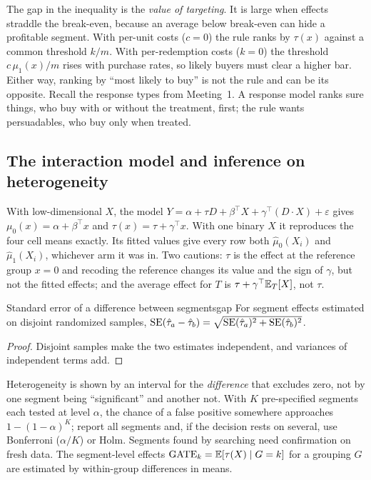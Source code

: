 \documentclass[11pt]{article}
\begin{document}
The gap in the inequality is the \emph{value of targeting}. It is large when effects straddle the break-even,
because an average below break-even can hide a profitable segment. With per-unit costs ($c=0$) the rule ranks by
$\tau(x)$ against a common threshold $k/m$. With per-redemption costs ($k=0$) the threshold $c\,\mu_1(x)/m$
rises with purchase rates, so likely buyers must clear a higher bar. Either way, ranking by ``most likely to
buy'' is not the rule and can be its opposite. Recall the response types from Meeting~1. A response model ranks
sure things, who buy with or without the treatment, first; the rule wants persuadables, who buy only when
treated.

\subsection{The interaction model and inference on heterogeneity}

With low-dimensional $X$, the model $Y = \alpha + \tau D + \beta^\top X + \gamma^\top (D \cdot X) + \varepsilon$ gives
$\mu_0(x) = \alpha + \beta^\top x$ and $\tau(x) = \tau + \gamma^\top x$. With one binary $X$ it reproduces the four
cell means exactly. Its fitted values give every row both $\hat\mu_0(X_i)$ and $\hat\mu_1(X_i)$, whichever arm it
was in. Two cautions: $\tau$ is the effect at the reference group $x=0$ and recoding the reference changes its
value and the sign of $\gamma$, but not the fitted effects; and the average effect for $T$ is
$\tau + \gamma^\top\mathbb{E}_T[X]$, not $\tau$.

\begin{prop}{Standard error of a difference between segments}{gap}
For segment effects estimated on disjoint randomized samples,
$\operatorname{SE}(\hat{\tau}_a - \hat{\tau}_b) = \sqrt{\operatorname{SE}(\hat{\tau}_a)^2 + \operatorname{SE}(\hat{\tau}_b)^2}$.
\end{prop}
\begin{proof}
Disjoint samples make the two estimates independent, and variances of independent terms add.
\end{proof}

Heterogeneity is shown by an interval for the \emph{difference} that excludes zero, not by one segment being
``significant'' and another not. With $K$ pre-specified segments each tested at level $\alpha$, the chance of a
false positive somewhere approaches $1 - (1-\alpha)^K$; report all segments and, if the decision rests on
several, use Bonferroni ($\alpha/K$) or Holm. Segments found by searching need confirmation on fresh data. The
segment-level effects $\text{GATE}_k = \mathbb{E}[\tau(X) \mid G=k]$ for a grouping $G$ are estimated by within-group
differences in means.
\end{document}
